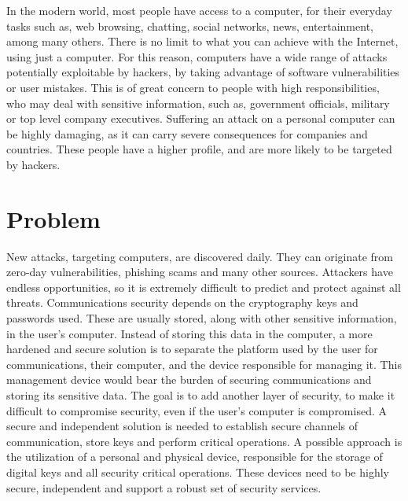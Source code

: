 \cleardoublepage
\label{chap:intro}

In the modern world, most people have access to a computer, for their everyday tasks such as, web browsing, chatting, social networks, news, entertainment, among many others.
There is no limit to what you can achieve with the Internet, using just a computer.
For this reason, computers have a wide range of attacks potentially exploitable by hackers, by taking advantage of software vulnerabilities or user mistakes.
This is of great concern to people with high responsibilities, who may deal with sensitive information, such as, government officials, military or top level company executives.
Suffering an attack on a personal computer can be highly damaging, as it can carry severe consequences for companies and countries.
These people have a higher profile, and are more likely to be targeted by hackers.

\section{Problem}\label{chap:intro:problem}

New attacks, targeting computers, are discovered daily.
They can originate from zero-day vulnerabilities, phishing scams and many other sources. Attackers have endless opportunities, so it is extremely difficult to predict and protect against all threats.
Communications security depends on the cryptography keys and passwords used. These are usually stored, along with other sensitive information, in the user's computer.
Instead of storing this data in the computer, a more hardened and secure solution is to separate the platform used by the user for communications, their computer, and the device responsible for managing it. This management device would bear the burden of securing communications and storing its sensitive data.
The goal is to add another layer of security, to make it difficult to compromise security, even if the user's computer is compromised.
A secure and independent solution is needed to establish secure channels of communication, store keys and perform critical operations.%
A possible approach is the utilization of a personal and physical device, responsible for the storage of digital keys and all security critical operations.
These devices need to be highly secure, independent and support a robust set of security services. %


